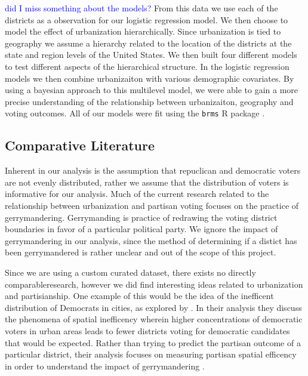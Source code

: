 \documentclass[12pt]{article}
\newcommand{\blue}[1]{\textcolor{blue}{#1}}
\begin{document}
\blue{did I miss something about the models?}
From this data we use each of the districts as a observation for our logistic regression model. We then choose to model the effect of urbanization hierarchically. Since urbanization is tied to geography we assume a hierarchy related to the location of the districts at the state and region levels of the United States. We then built four different models to test different aspects of the hierarchical structure. In the logistic regression  models we then combine urbanizaiton with various demographic covariates. By using a bayesian approach to this multilevel model, we were able to gain a more precise understanding of the relationship between urbanizaiton, geography and voting outcomes. All of our models were fit using the \texttt{brms} R package \parencite{brms}. 




\subsection*{Comparative Literature}
Inherent in our analysis is the assumption that repuclican and democratic voters are not evenly distributed, rather we assume that the distribution of voters is informative for our analysis. Much of the current research related to the relationship between urbanization and partisan voting focuses on the practice of gerrymandering. Gerrymanding is practice of redrawing the voting district boundaries in favor of a particular political party. We ignore the impact of gerrymandering in our analysis, since the method of determining if a distict has been gerrymandered is rather unclear and out of the scope of this project.

Since we are using a custom curated dataset, there exists no directly comparableresearch, however we did find interesting ideas related to urbanization and partisianship. One example of this would be the idea of the inefficent distribution of Democrats in cities, as explored by \cite{spatialefficency}. In their analysis they discuss the phenomena of spatial inefficency wherein higher concentrations of democratic voters in urban areas leads to fewer districts voting for democratic candidates that would be expected. Rather than trying to predict the partisan outcome of a particular district, their analysis focuses on measuring partisan spatial efficency in order to understand the impact of gerrymandering \parencite{spatialefficency}. 
\end{document}
